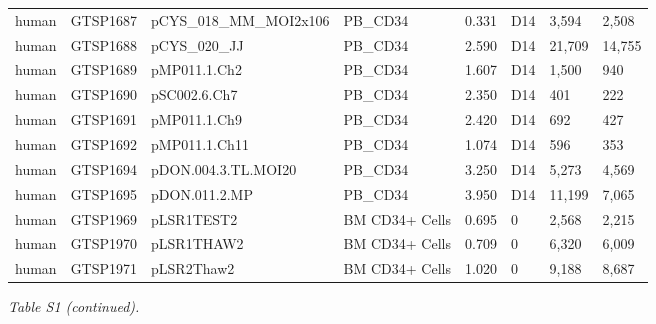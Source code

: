 \documentclass[12pt,]{article}
\begin{document}
\begin{table}[H]
{\begin{tabular}{llllrlll}
human & GTSP1687 & pCYS\_018\_MM\_MOI2x106 & PB\_CD34 & 0.331 & D14 & 3,594 & 2,508\\
human & GTSP1688 & pCYS\_020\_JJ & PB\_CD34 & 2.590 & D14 & 21,709 & 14,755\\
human & GTSP1689 & pMP011.1.Ch2 & PB\_CD34 & 1.607 & D14 & 1,500 & 940\\
human & GTSP1690 & pSC002.6.Ch7 & PB\_CD34 & 2.350 & D14 & 401 & 222\\
human & GTSP1691 & pMP011.1.Ch9 & PB\_CD34 & 2.420 & D14 & 692 & 427\\
human & GTSP1692 & pMP011.1.Ch11 & PB\_CD34 & 1.074 & D14 & 596 & 353\\
human & GTSP1694 & pDON.004.3.TL.MOI20 & PB\_CD34 & 3.250 & D14 & 5,273 & 4,569\\
human & GTSP1695 & pDON.011.2.MP & PB\_CD34 & 3.950 & D14 & 11,199 & 7,065\\
human & GTSP1969 & pLSR1TEST2 & BM CD34+ Cells & 0.695 & 0 & 2,568 & 2,215\\
human & GTSP1970 & pLSR1THAW2 & BM CD34+ Cells & 0.709 & 0 & 6,320 & 6,009\\
human & GTSP1971 & pLSR2Thaw2 & BM CD34+ Cells & 1.020 & 0 & 9,188 & 8,687\\
\bottomrule
\end{tabular}}
\end{table}

\newpage

\emph{Table S1 (continued).}\\
\end{document}
